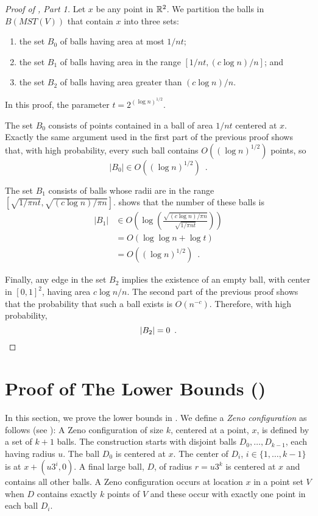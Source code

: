 \documentclass{patmorin}
\newcommand{\mst}{\mathit{MST}}
\begin{document}
\begin{proof}[Proof of , Part 1]
Let $x$ be any point in $\mathbb{R}^2$.  We partition the balls in $B(\mst(V))$
that contain $x$ into three sets:
\begin{enumerate}
  \item the set $B_0$ of balls having area at most $1/nt$;
  \item the set $B_1$ of balls having area in the range $[1/nt,(c\log
  n)/n]$; and
  \item the set $B_2$ of balls having area greater than $(c\log n)/n$.
\end{enumerate}
In this proof, the parameter $t=2^{(\log n)^{1/2}}$.

The set $B_0$ consists of points contained in a ball of area $1/nt$
centered at $x$.  Exactly the same argument used in the first part of
the previous proof shows that, with high probability, every such ball contains
$O((\log n)^{1/2})$ points, so
\[
     |B_0| \in O((\log n)^{1/2}) \enspace .
\]

The set $B_1$ consists of balls whose radii are in the range $[\sqrt{1/\pi
nt},\sqrt{(c\log n)/\pi n}]$.   shows that the number of
these balls is
\begin{align*}
    |B_1| & \in O\left(\log\left(\frac{\sqrt{(c\log n)/\pi n}}{\sqrt{1/\pi nt}}\right)\right) \\
    & = O(\log\log n + \log t) \\
    & = O((\log n)^{1/2}) \enspace .
\end{align*}

Finally, any edge in the set $B_2$ implies the existence of an empty ball,
with center in $[0,1]^2$, having area $c\log n/n$.  The second part of the
previous proof shows that the probability that such a ball exists is
$O(n^{-c})$.  Therefore, with high probability,
\[
   |B_2| = 0 \enspace . \qedhere
\]
\end{proof}

\section{Proof of The Lower Bounds ()}

In this section, we prove the lower bounds in .
We define a \emph{Zeno configuration} as follows (see ):
A Zeno configuration of size $k$, centered at a point, $x$, is defined
by a set of $k+1$ balls.  The construction starts with disjoint balls
$D_0,\ldots,D_{k-1}$, each having radius $u$.  The ball $D_0$ is centered
at $x$.  The center of $D_i$, $i\in\{1,\ldots,k-1\}$ is at $x+(u3^i, 0)$.
A final large ball, $D$, of radius $r=u3^k$ is centered at $x$ and
contains all other balls.  A Zeno configuration occurs at location $x$
in a point set $V$ when $D$ contains exactly $k$ points of $V$ and these
occur with exactly one point in each ball $D_i$.
\end{document}
